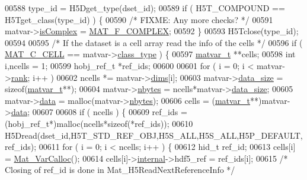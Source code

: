 \begin{DoxyCode}
00588     type\_id = H5Dget\_type(dset\_id);
00589     \textcolor{keywordflow}{if} ( H5T\_COMPOUND == H5Tget\_class(type\_id) ) \{
00590         \textcolor{comment}{/* FIXME: Any more checks? */}
00591         matvar->\hyperlink{group___m_a_t_aeb03b3a69f108dc05470b00443a43739}{isComplex} = \hyperlink{group___m_a_t_ggab9d6ef9e3ddca78a317b173f01d53fbbacd7b091a11184aad7fc6078c04470780}{MAT\_F\_COMPLEX};
00592     \}
00593     H5Tclose(type\_id);
00594 
00595     \textcolor{comment}{/* If the dataset is a cell array read the info of the cells */}
00596     \textcolor{keywordflow}{if} ( \hyperlink{group___m_a_t_ggad4d60ae7b709fc81bfd744fb4c857c40a2f7abb47a1c51e248bd4e5e03cc81b08}{MAT\_C\_CELL} == matvar->\hyperlink{group___m_a_t_aff13035bf3265dd7d9425e5d40c839d4}{class\_type} ) \{
00597         \hyperlink{group___m_a_t_structmatvar__t}{matvar\_t} **cells;
00598         \textcolor{keywordtype}{int} i,ncells = 1;
00599         hobj\_ref\_t *ref\_ids;
00600 
00601         \textcolor{keywordflow}{for} ( i = 0; i < matvar->\hyperlink{group___m_a_t_a84ba70c96ded13cc555fa75b768d9921}{rank}; i++ )
00602             ncells *= matvar->\hyperlink{group___m_a_t_a8e01234e1c862ce3472bb37f5a09b92c}{dims}[i];
00603         matvar->\hyperlink{group___m_a_t_a9ad1c82e2b568da617e12dc73a26e1f9}{data\_size} = \textcolor{keyword}{sizeof}(\hyperlink{group___m_a_t_structmatvar__t}{matvar\_t}**);
00604         matvar->\hyperlink{group___m_a_t_abf1c844540503be2df9bb3db93cfe307}{nbytes}    = ncells*matvar->\hyperlink{group___m_a_t_a9ad1c82e2b568da617e12dc73a26e1f9}{data\_size};
00605         matvar->\hyperlink{group___m_a_t_a5672978efa230bbdecdf38ede781f7fa}{data}      = malloc(matvar->\hyperlink{group___m_a_t_abf1c844540503be2df9bb3db93cfe307}{nbytes});
00606         cells = (\hyperlink{group___m_a_t_structmatvar__t}{matvar\_t}**)matvar->\hyperlink{group___m_a_t_a5672978efa230bbdecdf38ede781f7fa}{data};
00607 
00608         if ( ncells ) \{
00609             ref\_ids = (hobj\_ref\_t*)malloc(ncells*\textcolor{keyword}{sizeof}(*ref\_ids));
00610             H5Dread(dset\_id,H5T\_STD\_REF\_OBJ,H5S\_ALL,H5S\_ALL,H5P\_DEFAULT,ref\_ids);
00611             \textcolor{keywordflow}{for} ( i = 0; i < ncells; i++ ) \{
00612                 hid\_t ref\_id;
00613                 cells[i] = \hyperlink{group___m_a_t_gae7c9c3699f6e9c31a9c490300013098c}{Mat\_VarCalloc}();
00614                 cells[i]->\hyperlink{group___m_a_t_a6e97e3ed9f40c49322c18561c2a94e92}{internal}->hdf5\_ref = ref\_ids[i];
00615                 \textcolor{comment}{/* Closing of ref\_id is done in Mat\_H5ReadNextReferenceInfo */}

\end{DoxyCode}
